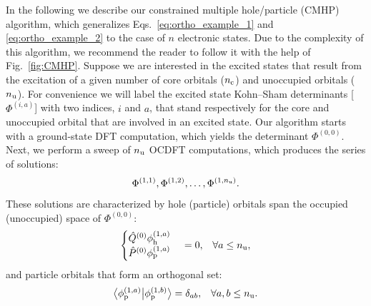 \documentclass[12pt]{article}
\newcommand{\braket}[3][0]
{\ifthenelse{\equal{#1}{0}}{\left\langle #2 \middle| #3 \right\rangle}
{\ifthenelse{\equal{#1}{1}}{\big\langle #2 \big| #3 \big\rangle}
{\ifthenelse{\equal{#1}{2}}{\Big\langle #2 \Big| #3 \Big\rangle}
{\ifthenelse{\equal{#1}{3}}{\bigg\langle #2 \bigg| #3 \bigg\rangle}
{\ifthenelse{\equal{#1}{4}}{\Bigg\langle #2 \Bigg| #3 \Bigg\rangle}
{Error}}}}}
}
\begin{document}
In the following we describe our constrained multiple hole/particle (CMHP) algorithm, which generalizes Eqs.~\eqref{eq:ortho_example_1} and \eqref{eq:ortho_example_2} to the case of $n$ electronic states.  Due to the complexity of this algorithm, we recommend the reader to follow it with the help of Fig.~\ref{fig:CMHP}.
Suppose we are interested in the excited states that result from the excitation of a given number of core orbitals ($n_{\rm c}$) and unoccupied orbitals ($n_{\rm u}$).
For convenience we will label the excited state Kohn--Sham determinants [$\Phi^{(i,a)}$] with two indices, $i$ and $a$, that stand respectively for the core and unoccupied orbital that are involved in an excited state.
Our algorithm starts with a ground-state DFT computation, which yields the determinant $\Phi^{(0,0)}$.
Next, we perform a sweep of $n_{\rm u}$ OCDFT computations, which produces the series of solutions:
\begin{equation}
\Phi^{(1,1)}, \Phi^{(1,2)}, \ldots, \Phi^{(1,n_{\rm u})}.
\end{equation}
These solutions are characterized by hole (particle) orbitals span the occupied (unoccupied) space of $\Phi^{(0,0)}$:
\begin{align}
\begin{cases}
\hat{Q}^{(0)}\phi_{\rm h}^{(1,a)}\\
\hat{P}^{(0)}\phi_{\rm p}^{(1,a)}
\end{cases} &= 0,&\forall a \leq n_{\rm u},
\end{align}
and particle orbitals that form an orthogonal set:
\begin{align}
\braket[1]{\phi^{(1,a)}_{\rm p}}{\phi^{(1,b)}_{\rm p}} &= \delta_{ab},&\forall a,b \leq n_{\rm u}.
\end{align}
\end{document}
